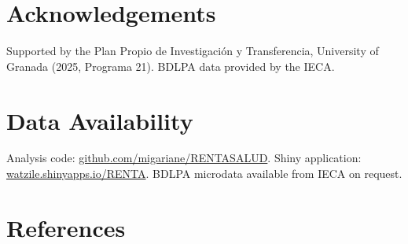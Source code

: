 \documentclass[
  11pt,
  a4paper,
]{article}
\begin{document}
\section{Acknowledgements}\label{acknowledgements}

Supported by the Plan Propio de Investigación y Transferencia,
University of Granada (2025, Programa 21). BDLPA data provided by the
IECA.

\section{Data Availability}\label{data-availability}

Analysis code:
\href{https://github.com/migariane/RENTASALUD}{github.com/migariane/RENTASALUD}.
Shiny application:
\href{https://watzile.shinyapps.io/RENTA/}{watzile.shinyapps.io/RENTA}.
BDLPA microdata available from IECA on request.

\section{References}\label{references}
\end{document}
